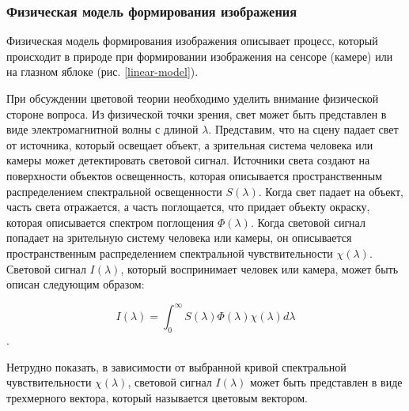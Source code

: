 \subsubsection{Физическая модель формирования изображения}\label{sect-1-1-1}

Физическая модель формирования изображения \cite{lib-maximov} описывает процесс, который происходит в природе при формировании изображения на сенсоре (камере) или на глазном яблоке (рис. \ref{linear-model}).


При обсуждении цветовой теории необходимо уделить внимание физической стороне вопроса. Из физической точки зрения, свет может быть представлен в виде электромагнитной волны с длиной $\lambda$. Представим, что на сцену падает свет от источника, который освещает объект, а зрительная система человека или камеры может детектировать световой сигнал. Источники света создают на поверхности объектов освещенность, которая описывается пространственным распределением спектральной освещенности $S(\lambda)$. Когда свет падает на объект, часть света отражается, а часть поглощается, что придает объекту окраску, которая описывается спектром поглощения $\Phi(\lambda)$. Когда световой сигнал попадает на зрительную систему человека или камеры, он описывается пространственным распределением спектральной чувствительности $\chi(\lambda)$. Световой сигнал $I(\lambda)$, который воспринимает человек или камера, может быть описан следующим образом:

\begin{equation}
\label{eq:1-1-1}
I(\lambda) = \int_{0}^{\infty} S(\lambda) \Phi(\lambda) \chi(\lambda) d\lambda
\end{equation}.

Нетрудно показать, в зависимости от выбранной кривой спектральной чувствительности $\chi(\lambda)$, световой сигнал $I(\lambda)$ может быть представлен в виде трехмерного вектора, который называется цветовым вектором.
